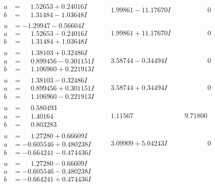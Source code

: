 \documentclass[1p]{elsarticle_modified}
\theoremstyle{definition}
\begin{document}
$$\begin{array}{c|c|c}
\begin{aligned}
a &= \phantom{-}1.52653 + 0.24016 I \\
b &= \phantom{-}1.31484 - 1.03648 I\end{aligned}
 & \phantom{-}1.99861 - 11.17670 I & \phantom{-0.000000 } 0 \\ \hline\begin{aligned}
u &= -1.29947 - 0.56604 I \\
a &= \phantom{-}1.52653 - 0.24016 I \\
b &= \phantom{-}1.31484 + 1.03648 I\end{aligned}
 & \phantom{-}1.99861 + 11.17670 I & \phantom{-0.000000 } 0 \\ \hline\begin{aligned}
u &= \phantom{-}1.38103 + 0.32486 I \\
a &= \phantom{-}0.899456 - 0.301151 I \\
b &= \phantom{-}1.106960 + 0.221913 I\end{aligned}
 & \phantom{-}3.58744 - 0.34494 I & \phantom{-0.000000 } 0 \\ \hline\begin{aligned}
u &= \phantom{-}1.38103 - 0.32486 I \\
a &= \phantom{-}0.899456 + 0.301151 I \\
b &= \phantom{-}1.106960 - 0.221913 I\end{aligned}
 & \phantom{-}3.58744 + 0.34494 I & \phantom{-0.000000 } 0 \\ \hline\begin{aligned}
u &= \phantom{-}0.580493\phantom{ +0.000000I} \\
a &= \phantom{-}1.40164\phantom{ +0.000000I} \\
b &= \phantom{-}0.803283\phantom{ +0.000000I}\end{aligned}
 & \phantom{-}1.11567\phantom{ +0.000000I} & \phantom{-}9.71800\phantom{ +0.000000I} \\ \hline\begin{aligned}
u &= \phantom{-}1.27280 + 0.66609 I \\
a &= -0.605546 + 0.480238 I \\
b &= -0.664241 - 0.474436 I\end{aligned}
 & \phantom{-}3.09909 + 5.04243 I & \phantom{-0.000000 } 0 \\ \hline\begin{aligned}
u &= \phantom{-}1.27280 - 0.66609 I \\
a &= -0.605546 - 0.480238 I \\
b &= -0.664241 + 0.474436 I\end{aligned}

\end{array}$$
\end{document}
